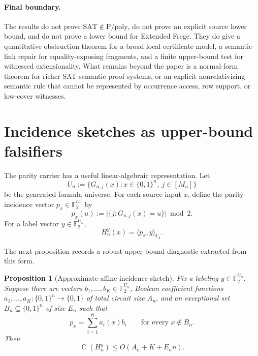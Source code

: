 \documentclass[11pt]{article}
\newtheorem{proposition}[theorem]{Proposition}
\theoremstyle{definition}
\newcommand{\bits}{\{0,1\}}
\newcommand{\F}{\mathbb{F}_2}
\newcommand{\Ckt}{\operatorname{C}}
\newcommand{\SAT}{\mathrm{SAT}}
\newcommand{\Ppoly}{\mathrm{P/poly}}
\begin{document}
\paragraph{Final boundary.}
The results do not prove $\SAT\notin\Ppoly$, do not prove an explicit source lower bound, and do not prove a lower bound for Extended Frege. They do give a quantitative obstruction theorem for a broad local certificate model, a semantic-link repair for equality-exposing fragments, and a finite upper-bound test for witnessed extensionality. What remains beyond the paper is a normal-form theorem for richer SAT-semantic proof systems, or an explicit nonrelativizing semantic rule that cannot be represented by occurrence access, row support, or low-cover witnesses.

\appendix

\section{Incidence sketches as upper-bound falsifiers}\label{app:incidence}

The parity carrier has a useful linear-algebraic representation. Let
\[
  U_n:=\{G_{n,j}(x):x\in\bits^n,\ j\in[M_n]\}
\]
be the generated formula universe. For each source input $x$, define the parity-incidence vector $p_x\in\F^{U_n}$ by
\[
  p_x(u):=\bigl|\{j:G_{n,j}(x)=u\}\bigr|\bmod 2.
\]
For a label vector $y\in\F^{U_n}$,
\begin{equation}\label{eq:incidence-inner-product}
  H_n^y(x)=\langle p_x,y\rangle_{\F}.
\end{equation}

The next proposition records a robust upper-bound diagnostic extracted from this form.

\begin{proposition}[Approximate affine-incidence sketch]\label{prop:affine-sketch}
Fix a labeling $y\in\F^{U_n}$. Suppose there are vectors $b_1,\ldots,b_K\in\F^{U_n}$, Boolean coefficient functions $a_1,\ldots,a_K:\bits^n\to\bits$ of total circuit size $A_n$, and an exceptional set $B_n\subseteq\bits^n$ of size $E_n$ such that
\begin{equation}\label{eq:incidence-sketch}
  p_x=\sum_{i=1}^K a_i(x)b_i
  \qquad\text{for every }x\notin B_n.
\end{equation}
Then
\begin{equation}\label{eq:sketch-upper-bound}
  \Ckt(H_n^y)\le O(A_n+K+E_nn).
\end{equation}
\end{proposition}
\end{document}
